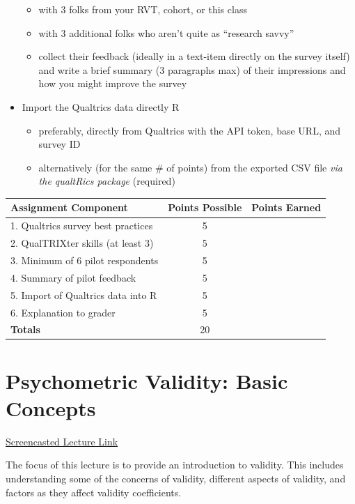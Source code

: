 \documentclass[
  english,
]{book}
\providecommand{\tightlist}{%
  \setlength{\itemsep}{0pt}\setlength{\parskip}{0pt}}
\begin{document}
\begin{itemize}
  \begin{itemize}
  \tightlist
  \item
    with 3 folks from your RVT, cohort, or this class
  \item
    with 3 additional folks who aren't quite as ``research savvy''
  \item
    collect their feedback (ideally in a text-item directly on the survey itself) and write a brief summary (3 paragraphs max) of their impressions and how you might improve the survey
  \end{itemize}
\item
  Import the Qualtrics data directly R

  \begin{itemize}
  \tightlist
  \item
    preferably, directly from Qualtrics with the API token, base URL, and survey ID
  \item
    alternatively (for the same \# of points) from the exported CSV file \emph{via the qualtRics package} (required)
  \end{itemize}
\end{itemize}

\begin{longtable}[]{@{}lcc@{}}
\toprule
Assignment Component & Points Possible & Points Earned \\
\midrule
\endhead
1. Qualtrics survey best practices & 5 & \\
2. QualTRIXter skills (at least 3) & 5 & \\
3. Minimum of 6 pilot respondents & 5 & \\
4. Summary of pilot feedback & 5 & \\
5. Import of Qualtrics data into R & 5 & \\
6. Explanation to grader & 5 & \\
\textbf{Totals} & 20 & \\
\bottomrule
\end{longtable}

\hypertarget{rxy}{%
\chapter{Psychometric Validity: Basic Concepts}\label{rxy}}

\href{link}{Screencasted Lecture Link}

The focus of this lecture is to provide an introduction to validity. This includes understanding some of the concerns of validity, different aspects of validity, and factors as they affect validity coefficients.
\end{document}
